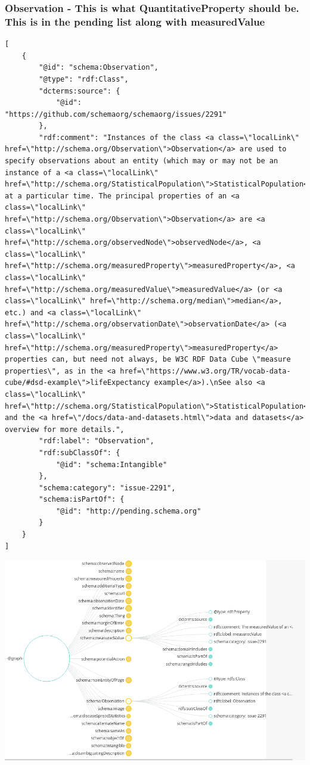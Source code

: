\documentclass[11pt]{article}
\begin{document}
\subsubsection{Observation - This is what QuantitativeProperty should be. This is in the pending list along with measuredValue}
\label{sec:orgc32b12b}
\begin{verbatim}
[
    {
        "@id": "schema:Observation",
        "@type": "rdf:Class",
        "dcterms:source": {
            "@id": "https://github.com/schemaorg/schemaorg/issues/2291"
        },
        "rdf:comment": "Instances of the class <a class=\"localLink\" href=\"http://schema.org/Observation\">Observation</a> are used to specify observations about an entity (which may or may not be an instance of a <a class=\"localLink\" href=\"http://schema.org/StatisticalPopulation\">StatisticalPopulation</a>), at a particular time. The principal properties of an <a class=\"localLink\" href=\"http://schema.org/Observation\">Observation</a> are <a class=\"localLink\" href=\"http://schema.org/observedNode\">observedNode</a>, <a class=\"localLink\" href=\"http://schema.org/measuredProperty\">measuredProperty</a>, <a class=\"localLink\" href=\"http://schema.org/measuredValue\">measuredValue</a> (or <a class=\"localLink\" href=\"http://schema.org/median\">median</a>, etc.) and <a class=\"localLink\" href=\"http://schema.org/observationDate\">observationDate</a> (<a class=\"localLink\" href=\"http://schema.org/measuredProperty\">measuredProperty</a> properties can, but need not always, be W3C RDF Data Cube \"measure properties\", as in the <a href=\"https://www.w3.org/TR/vocab-data-cube/#dsd-example\">lifeExpectancy example</a>).\nSee also <a class=\"localLink\" href=\"http://schema.org/StatisticalPopulation\">StatisticalPopulation</a>, and the <a href=\"/docs/data-and-datasets.html\">data and datasets</a> overview for more details.",
        "rdf:label": "Observation",
        "rdf:subClassOf": {
            "@id": "schema:Intangible"
        },
        "schema:category": "issue-2291",
        "schema:isPartOf": {
            "@id": "http://pending.schema.org"
        }
    }
]
\end{verbatim}
\begin{center}
\includegraphics[width=.9\linewidth]{./obs.png}
\end{center}
\end{document}

